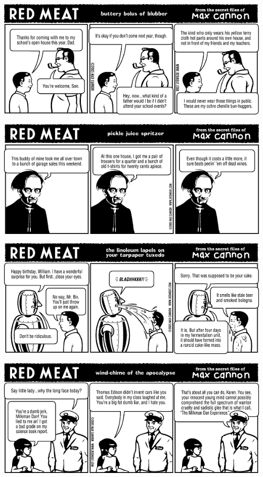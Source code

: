 \documentclass[a4paper,twoside,11pt]{article}
\begin{document}
\includegraphics[width=\textwidth]{redmeat_2005-05-10.png}



\includegraphics[width=\textwidth]{redmeat_2005-05-17.png}



\includegraphics[width=\textwidth]{redmeat_2005-05-24.png}



\includegraphics[width=\textwidth]{redmeat_2005-05-31.png}
\end{document}
